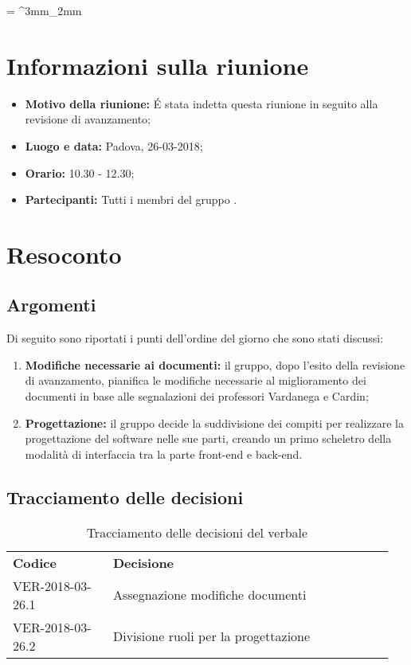\documentclass[VER-2018-03-26.tex]{subfiles}
\begin{document}
\tabulinesep = ^3mm_2mm
\chapter{Informazioni sulla riunione}
\begin{itemize}
	\item \textbf{Motivo della riunione:} \'E stata indetta questa riunione in seguito alla revisione di avanzamento;
	\item \textbf{Luogo e data:} Padova, 26-03-2018;
	\item \textbf{Orario:} 10.30 - 12.30;
	\item \textbf{Partecipanti:} Tutti i membri del gruppo \gruppo.
\end{itemize}



\chapter{Resoconto}
\section{Argomenti}
Di seguito sono riportati i punti dell'ordine del giorno che sono stati discussi:
\begin{enumerate}
	\item \textbf{Modifiche necessarie ai documenti:} il gruppo, dopo l'esito della revisione di avanzamento, pianifica le modifiche necessarie al miglioramento dei documenti in base alle segnalazioni dei professori Vardanega e Cardin;
	\item \textbf{Progettazione:} il gruppo decide la suddivisione dei compiti per realizzare la progettazione del software nelle sue parti, creando un primo scheletro della modalità di interfaccia tra la parte front-end e back-end.
\end{enumerate}
\section{Tracciamento delle decisioni}
\begin{table}[H]
	\begin{center}
		\begin{tabu} to 
			\tableHeaderStyle
			\textbf{Codice} & \textbf{Decisione} \\
			VER-2018-03-26.1 & Assegnazione modifiche documenti \\
			VER-2018-03-26.2 & Divisione ruoli per la progettazione \\
		\end{tabu}
		\caption{Tracciamento delle decisioni del verbale}
	\end{center}
\end{table}
\end{document}
